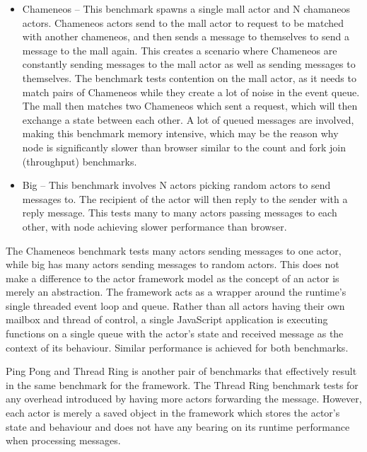 \documentclass[12pt, a4paper]{report}
\theoremstyle{definition}
\theoremstyle{definition}%
\theoremstyle{definition}%
\theoremstyle{definition}%
\theoremstyle{definition}%
\theoremstyle{definition}%
\begin{document}
\begin{itemize}
    \item Chameneos – This benchmark spawns a single mall actor and N chamaneos actors. Chameneos actors send to the mall actor to request to be matched with another chameneos, and then sends a message to themselves to send a message to the mall again. This creates a scenario where Chameneos are constantly sending messages to the mall actor as well as sending messages to themselves. The benchmark tests contention on the mall actor, as it needs to match pairs of Chameneos while they create a lot of noise in the event queue. The mall then matches two Chameneos which sent a request, which will then exchange a state between each other. A lot of queued messages are involved, making this benchmark memory intensive, which may be the reason why node is significantly slower than browser similar to the count and fork join (throughput) benchmarks.
    \item Big – This benchmark involves N actors picking random actors to send messages to. The recipient of the actor will then reply to the sender with a reply message. This tests many to many actors passing messages to each other, with node achieving slower performance than browser.
\end{itemize}
The Chameneos benchmark tests many actors sending messages to one actor, while big has many actors sending messages to random actors. This does not make a difference to the actor framework model as the concept of an actor is merely an abstraction. The framework acts as a wrapper around the runtime’s single threaded event loop and queue. Rather than all actors having their own mailbox and thread of control, a single JavaScript application is executing functions on a single queue with the actor’s state and received message as the context of its behaviour. Similar performance is achieved for both benchmarks.

Ping Pong and Thread Ring is another pair of benchmarks that effectively result in the same benchmark for the framework. The Thread Ring benchmark tests for any overhead introduced by having more actors forwarding the message. However, each actor is merely a saved object in the framework which stores the actor’s state and behaviour and does not have any bearing on its runtime performance when processing messages.
\end{document}
